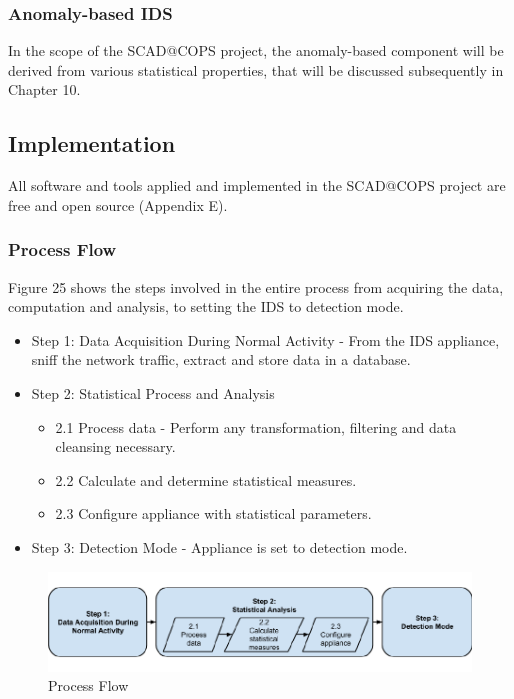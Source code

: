\documentclass[11pt,]{article}
\begin{document}
\subsubsection{Anomaly-based IDS}\label{anomaly-based-ids}

In the scope of the SCAD@COPS project, the anomaly-based component will
be derived from various statistical properties, that will be discussed
subsequently in Chapter 10.

\subsection{Implementation}\label{implementation}

All software and tools applied and implemented in the SCAD@COPS project
are free and open source (Appendix E).

\subsubsection{Process Flow}\label{process-flow}

Figure 25 shows the steps involved in the entire process from acquiring
the data, computation and analysis, to setting the IDS to detection
mode.

\begin{itemize}
\itemsep1pt\parskip0pt
\item
  Step 1: Data Acquisition During Normal Activity - From the IDS
  appliance, sniff the network traffic, extract and store data in a
  database.
\item
  Step 2: Statistical Process and Analysis

  \begin{itemize}
  \itemsep1pt\parskip0pt
  \item
    2.1 Process data - Perform any transformation, filtering and data
    cleansing necessary.
  \item
    2.2 Calculate and determine statistical measures.
  \item
    2.3 Configure appliance with statistical parameters.
  \end{itemize}
\item
  Step 3: Detection Mode - Appliance is set to detection mode.
\end{itemize}

\begin{figure}[h]

{\centering \includegraphics{thesis_files/figure-latex/unnamed-chunk-37-1} 

}

\caption{Process Flow}\label{fig:unnamed-chunk-37}
\end{figure}
\end{document}
